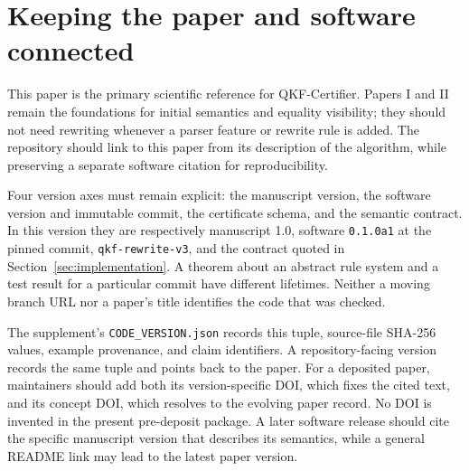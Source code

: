 \section{Keeping the paper and software connected}\label{sec:evolution}

This paper is the primary scientific reference for QKF-Certifier. Papers I and II remain the foundations for initial semantics and equality visibility; they should not need rewriting whenever a parser feature or rewrite rule is added. The repository should link to this paper from its description of the algorithm, while preserving a separate software citation for reproducibility.

Four version axes must remain explicit: the manuscript version, the software version and immutable commit, the certificate schema, and the semantic contract. In this version they are respectively manuscript 1.0, software \texttt{0.1.0a1} at the pinned commit, \texttt{qkf-rewrite-v3}, and the contract quoted in Section~\ref{sec:implementation}. A theorem about an abstract rule system and a test result for a particular commit have different lifetimes. Neither a moving branch URL nor a paper's title identifies the code that was checked.

The supplement's \texttt{CODE\_VERSION.json} records this tuple, source-file SHA-256 values, example provenance, and claim identifiers. A repository-facing version records the same tuple and points back to the paper. For a deposited paper, maintainers should add both its version-specific DOI, which fixes the cited text, and its concept DOI, which resolves to the evolving paper record. No DOI is invented in the present pre-deposit package. A later software release should cite the specific manuscript version that describes its semantics, while a general README link may lead to the latest paper version.

